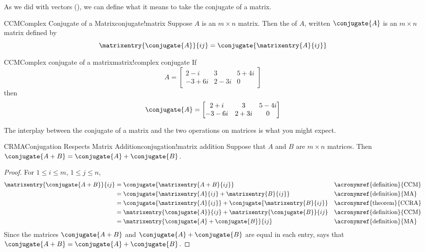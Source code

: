 %
%
As we did with vectors (), we can define what it means to take the conjugate of a matrix.
%
\begin{definition}{CCM}{Complex Conjugate of a Matrix}{conjugate!matrix}
Suppose $A$ is an $m\times n$ matrix.  Then the  of $A$, written $\conjugate{A}$ is an $m\times n$ matrix defined by
%
\begin{equation*}
\matrixentry{\conjugate{A}}{ij}=\conjugate{\matrixentry{A}{ij}}
\end{equation*}
%
\end{definition}
%
%
\begin{example}{CCM}{Complex conjugate of a matrix}{matrix!complex conjugate}
If
%
\begin{equation*}
A=
\begin{bmatrix}
2-i & 3 & 5+4i\\
-3+6i & 2-3i & 0
\end{bmatrix}
\end{equation*}
%
then
%
\begin{equation*}
\conjugate{A}=
\begin{bmatrix}
2+i & 3 & 5-4i\\
-3-6i & 2+3i & 0
\end{bmatrix}
\end{equation*}
%
\end{example}
%
The interplay between the conjugate of a matrix and the two operations on matrices is what you might expect.
%
\begin{theorem}{CRMA}{Conjugation Respects Matrix Addition}{conjugation!matrix addition}
Suppose that $A$ and $B$ are $m\times n$ matrices.  Then $\conjugate{A+B}=\conjugate{A}+\conjugate{B}$.
\end{theorem}
%
\begin{proof}
%
For $1\leq i\leq m$, $1\leq j\leq n$,
%
\begin{align*}
%
\matrixentry{\conjugate{A+B}}{ij}
&=\conjugate{\matrixentry{A+B}{ij}}&&\text{\acronymref{definition}{CCM}}\\
&=\conjugate{\matrixentry{A}{ij}+\matrixentry{B}{ij}}&&\text{\acronymref{definition}{MA}}\\
&=\conjugate{\matrixentry{A}{ij}}+\conjugate{\matrixentry{B}{ij}}&&\text{\acronymref{theorem}{CCRA}}\\
&=\matrixentry{\conjugate{A}}{ij}+\matrixentry{\conjugate{B}}{ij}&&\text{\acronymref{definition}{CCM}}\\
&=\matrixentry{\conjugate{A}+\conjugate{B}}{ij}&&\text{\acronymref{definition}{MA}}
%
\end{align*}
%
Since the matrices  $\conjugate{A+B}$ and $\conjugate{A}+\conjugate{B}$  are equal in each entry,  says that $\conjugate{A+B}=\conjugate{A}+\conjugate{B}$.
%
\end{proof}

